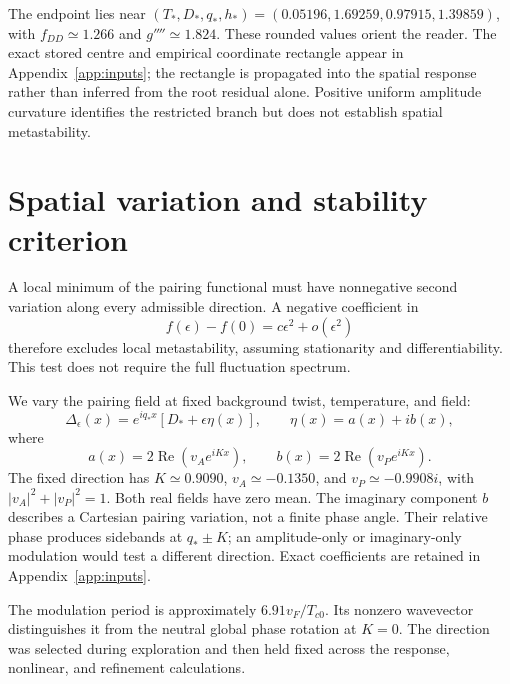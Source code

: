 \documentclass[11pt,a4paper]{article}
\newcommand{\Tc}{T_{c0}}
\begin{document}
The endpoint lies near $(T_*,D_*,q_*,h_*)=(0.05196,1.69259,0.97915,1.39859)$, with $f_{DD}\simeq1.266$ and $g''''\simeq1.824$. These rounded values orient the reader. The exact stored centre and empirical coordinate rectangle appear in Appendix~\ref{app:inputs}; the rectangle is propagated into the spatial response rather than inferred from the root residual alone. Positive uniform amplitude curvature identifies the restricted branch but does not establish spatial metastability.

\section{Spatial variation and stability criterion}\label{sec:witness}
A local minimum of the pairing functional must have nonnegative second variation along every admissible direction. A negative coefficient in
\begin{equation}\label{eq:descent}
 f(\epsilon)-f(0)=c\epsilon^2+o(\epsilon^2)
\end{equation}
therefore excludes local metastability, assuming stationarity and differentiability. This test does not require the full fluctuation spectrum.

We vary the pairing field at fixed background twist, temperature, and field:
\begin{equation}\label{eq:perturb}
 \Delta_\epsilon(x)=e^{iq_*x}[D_*+\epsilon\eta(x)],\qquad
 \eta(x)=a(x)+ib(x),
\end{equation}
where
\begin{equation}\label{eq:ab}
 a(x)=2\operatorname{Re}(v_Ae^{iKx}),\qquad
 b(x)=2\operatorname{Re}(v_Pe^{iKx}).
\end{equation}
The fixed direction has $K\simeq0.9090$, $v_A\simeq-0.1350$, and $v_P\simeq-0.9908i$, with $|v_A|^2+|v_P|^2=1$. Both real fields have zero mean. The imaginary component $b$ describes a Cartesian pairing variation, not a finite phase angle. Their relative phase produces sidebands at $q_*\pm K$; an amplitude-only or imaginary-only modulation would test a different direction. Exact coefficients are retained in Appendix~\ref{app:inputs}.

The modulation period is approximately $6.91v_F/\Tc$. Its nonzero wavevector distinguishes it from the neutral global phase rotation at $K=0$. The direction was selected during exploration and then held fixed across the response, nonlinear, and refinement calculations.
\end{document}
